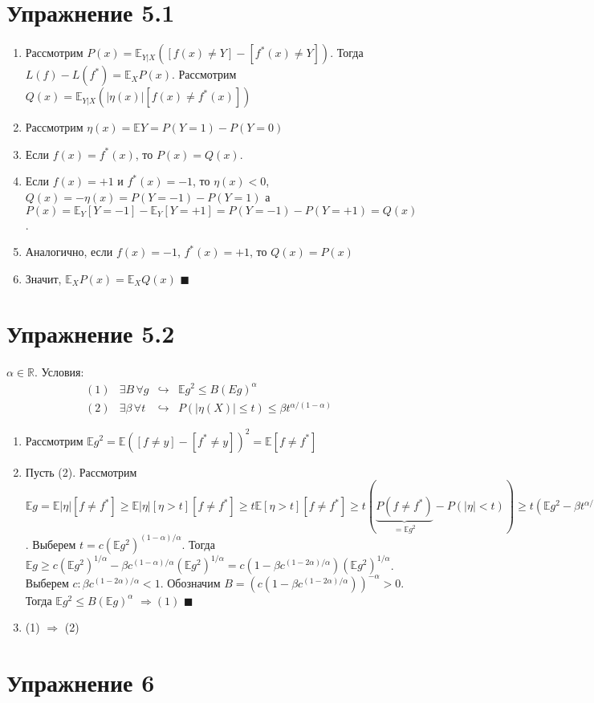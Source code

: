 \documentclass[a4paper]{article}
\newcommand{\R}{\mathbb{R}}
\newcommand{\E}{\mathbb{E}}
\begin{document}
\section*{Упражнение 5.1}

\begin{enumerate}
\item Рассмотрим $P(x)=\E_{Y|X}([f(x)\neq Y]-[f^*(x)\neq Y])$. Тогда $L(f)-L(f^*)=\E_X P(x)$. Рассмотрим $Q(x)=\E_{Y|X}(|\eta(x)|[f(x)\neq f^*(x)])$
\item Рассмотрим $\eta(x)=\E Y=P(Y=1)-P(Y=0)$
\item Если $f(x)=f^*(x)$, то $P(x)=Q(x)$.
\item Если $f(x)=+1$ и $f^*(x)=-1$, то $\eta(x)<0$, $Q(x)=-\eta(x)=P(Y=-1)-P(Y=1)$ а $P(x)=\E_Y[Y=-1]-\E_Y[Y=+1]=P(Y=-1)-P(Y=+1)=Q(x)$.
\item Аналогично, если $f(x)=-1$, $f^*(x)=+1$, то $Q(x)=P(x)$
\item Значит, $\E_XP(x)=\E_XQ(x)$ $\blacksquare$
\end{enumerate}
\section*{Упражнение 5.2}
$\alpha\in\R$. Условия:
$$
\begin{array}{llrl}
(1) & \exists B\,\forall g &\hookrightarrow & \E g^2\leqslant B(Eg)^{\alpha}\\
(2) & \exists \beta\,\forall t & \hookrightarrow & P(|\eta(X)|\leqslant t)\leqslant \beta t^{\alpha/(1-\alpha)}
\end{array}
$$
\begin{enumerate}
\item Рассмотрим $\E g^2=\E([f\neq y]-[f^*\neq y])^2=\E[f\neq f^*]$
\item Пусть (2). Рассмотрим $\E g=\E |\eta|[f\neq f^*]\geqslant \E |\eta|[\eta >t][f\neq f^*]\geqslant t\E [\eta>t][f\neq f^*]\geqslant t(\underbrace{P(f\neq f^*)}_{=\E g^2}-P(|\eta|<t))\geqslant t(\E g^2-\beta t^{\alpha/(1-\alpha)})$. Выберем $t=c(\E g^2)^{(1-\alpha)/\alpha}$. Тогда $\E g\geqslant c(\E g^2)^{1/\alpha}-\beta c^{(1-\alpha)/\alpha}(\E g^2)^{1/\alpha}=c(1-\beta c^{(1-2\alpha)/\alpha})(\E g^2)^{1/\alpha}$. Выберем $c\colon \beta c^{(1-2\alpha)/\alpha}<1$. Обозначим $B=(c(1-\beta c^{(1-2\alpha)/\alpha}))^{-\alpha}>0$. Тогда $\E g^2\leqslant B(\E g)^\alpha$ $\Rightarrow (1)$ $\blacksquare$
\item (1) $\Rightarrow$ (2)
\end{enumerate}
\section*{Упражнение 6}
\end{document}
